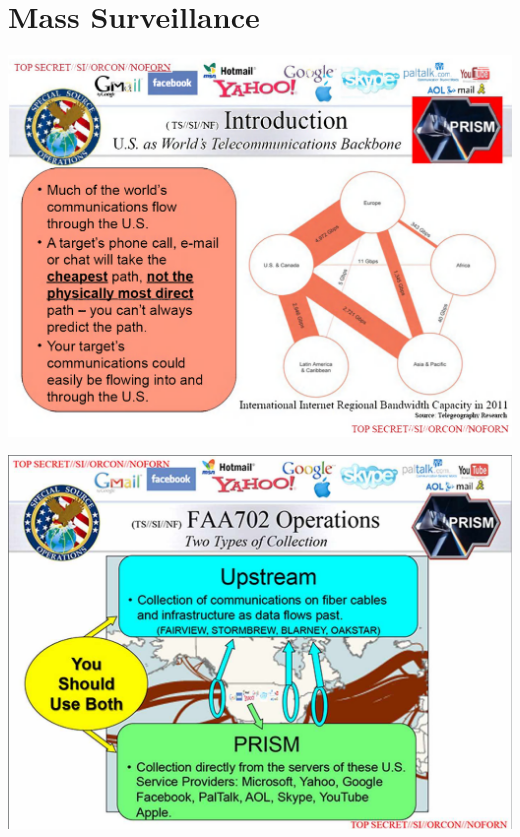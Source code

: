 \documentclass[nobackground,dvipsnames,table,aspectratio=169]{beamer}
\begin{document}
\section{Mass Surveillance}

\begin{frame}{}
    \centering
    \includegraphics[height=0.9\textheight]{prism1}
\end{frame}

\begin{frame}{}
    \centering
    \includegraphics[height=0.9\textheight]{prism2}
\end{frame}
\end{document}
